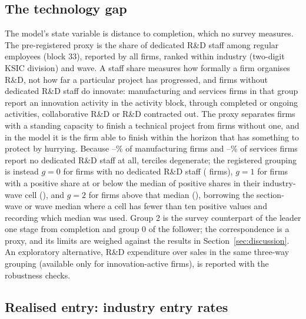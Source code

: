 \documentclass[preprint,12pt,authoryear]{elsarticle}
\begin{document}
\subsection{The technology gap}

The model's state variable is distance to completion, which no survey measures. The pre-registered proxy is the share of dedicated R\&D staff among regular employees (block 33), reported by all firms, ranked within industry (two-digit KSIC division) and wave. A staff share measures how formally a firm organises R\&D, not how far a particular project has progressed, and firms without dedicated R\&D staff do innovate: \SecGapNInnovManuZero{} manufacturing and \SecGapNInnovServZero{} services firms in that group report an innovation activity in the activity block, through completed or ongoing activities, collaborative R\&D or R\&D contracted out. The proxy separates firms with a standing capacity to finish a technical project from firms without one, and in the model it is the firm able to finish within the horizon that has something to protect by hurrying. Because \ShareZeroRDManuMinPct--\ShareZeroRDManuMaxPct\% of manufacturing firms and \ShareZeroRDServMinPct--\ShareZeroRDServMaxPct\% of services firms report no dedicated R\&D staff at all, terciles degenerate; the registered grouping is instead $g = 0$ for firms with no dedicated R\&D staff (\GapZeroN{} firms), $g = 1$ for firms with a positive share at or below the median of positive shares in their industry-wave cell (\GapOneN), and $g = 2$ for firms above that median (\GapTwoN), borrowing the section-wave or wave median where a cell has fewer than ten positive values and recording which median was used. Group 2 is the survey counterpart of the leader one stage from completion and group 0 of the follower; the correspondence is a proxy, and its limits are weighed against the results in Section~\ref{sec:discussion}. An exploratory alternative, R\&D expenditure over sales in the same three-way grouping (available only for innovation-active firms), is reported with the robustness checks.

\subsection{Realised entry: industry entry rates}
\end{document}
